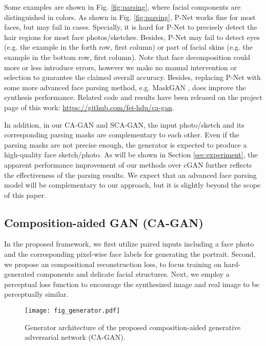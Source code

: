\documentclass[journal]{IEEEtran}
\begin{document}
Some examples are shown in Fig. \ref{fig:parsing}, where facial components are distinguished in colors.  
As shown in Fig. \ref{fig:parsing}, P-Net works fine for most faces, but may fail in cases. Specially, it is hard for P-Net to precisely detect the hair regions for most face photos/sketches. Besides, P-Net may fail to detect eyes (e.g. the example in the forth row, first column) or part of facial skins (e.g. the example in the bottom row, first column). 
Note that face decomposition could more or less introduce errors, however we make no manual intervention or selection to guarantee the claimed overall accuracy. Besides, replacing P-Net with some more advanced face parsing method, e.g. MaskGAN \cite{CelebAMaskHQ}, does improve the synthesis performance. Related code and results have been released on the project page of this work: \url{https://github.com/fei-hdu/ca-gan}.  

In addition, in our CA-GAN and SCA-GAN, the input photo/sketch and its corresponding parsing masks are complementary to each other. Even if the parsing masks are not precise enough, the generator is expected to produce a high-quality face sketch/photo. As will be shown in Section \ref{sec:experiment}, the apparent performance improvement of our methods over cGAN further reflects the effectiveness of the parsing results. We expect that an advanced face parsing model will be complementary to our approach, but it is slightly beyond the scope of this paper.


\subsection{Composition-aided GAN (CA-GAN)}
\label{sec:composegan}


In the proposed framework, we first utilize paired inputs including a face photo and the corresponding pixel-wise face labels for generating the portrait.
Second, we propose an compositional reconstruction loss, to focus training on hard-generated components and delicate facial structures.
Next, we employ a perceptual loss function to encourage the synthesized image and real image to be perceptually similar. 


\begin{figure}
\begin{center}
\texttt{[image: fig\_generator.pdf]}
\end{center}
   \vspace{-0.4cm}
   \caption{Generator architecture of the proposed composition-aided generative adversarial network (CA-GAN).}
\label{fig:cagan}
   \vspace{-0.4cm}
\end{figure}
\end{document}
